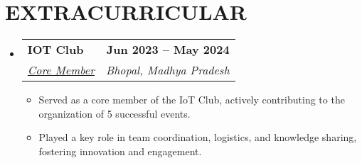 \documentclass[letterpaper,11pt]{article}
\makeatletter
\newcommand{\resumeItem}[1]{
  \item\small{
    {#1 \vspace{-2pt}}
  }
}
\newcommand{\resumeSubheading}[4]{
  \vspace{-2pt}\item
    \begin{tabular*}{1.0\textwidth}[t]{l@{\extracolsep{\fill}}r}
      \textbf{\large#1} & \textbf{\small #2} \\
      \textit{\large#3} & \textit{\small #4} \\
      
    \end{tabular*}\vspace{-7pt}
}
\newcommand{\resumeSubHeadingListStart}{\begin{itemize}[leftmargin=0.0in, label={}]}
\newcommand{\resumeSubHeadingListEnd}{\end{itemize}}
\newcommand{\resumeItemListStart}{\begin{itemize}}
\newcommand{\resumeItemListEnd}{\end{itemize}\vspace{-5pt}}
\makeatother
\begin{document}
\section{EXTRACURRICULAR}
    \resumeSubHeadingListStart
        \resumeSubheading{IOT Club\href{Certificate Proof link}{\raisebox{-0.1\height}\faExternalLink } }{Jun 2023 -- May 2024}{\underline{Core Member}}{Bhopal, Madhya Pradesh}
            \resumeItemListStart
                \resumeItem{\normalsize{Served as a core member of the IoT Club, actively contributing to the organization of 5 successful events. \textbf{}}}
                 \resumeItem{\normalsize{Played a key role in team coordination, logistics, and knowledge sharing, fostering innovation and engagement.}}
                
            \resumeItemListEnd
    \resumeSubHeadingListEnd
 \vspace{-11pt}
 
\end{document}
